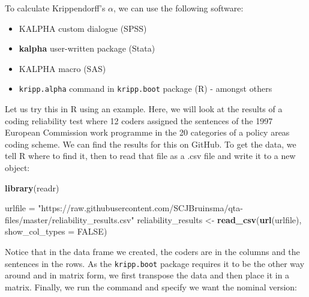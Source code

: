 \documentclass[
]{book}
\newenvironment{Shaded}{\begin{snugshade}}{\end{snugshade}}
\newcommand{\AttributeTok}[1]{\textcolor[rgb]{0.13,0.29,0.53}{#1}}
\newcommand{\ConstantTok}[1]{\textcolor[rgb]{0.56,0.35,0.01}{#1}}
\newcommand{\DecValTok}[1]{\textcolor[rgb]{0.00,0.00,0.81}{#1}}
\newcommand{\FunctionTok}[1]{\textcolor[rgb]{0.13,0.29,0.53}{\textbf{#1}}}
\newcommand{\NormalTok}[1]{#1}
\newcommand{\OtherTok}[1]{\textcolor[rgb]{0.56,0.35,0.01}{#1}}
\newcommand{\SpecialCharTok}[1]{\textcolor[rgb]{0.81,0.36,0.00}{\textbf{#1}}}
\newcommand{\StringTok}[1]{\textcolor[rgb]{0.31,0.60,0.02}{#1}}
\providecommand{\tightlist}{%
  \setlength{\itemsep}{0pt}\setlength{\parskip}{0pt}}
\begin{document}
To calculate Krippendorff's \(\alpha\), we can use the following software:

\begin{itemize}
\tightlist
\item
  KALPHA custom dialogue (SPSS)
\item
  \textbf{kalpha} user-written package (Stata)
\item
  KALPHA macro (SAS)
\item
  \texttt{kripp.alpha} command in \texttt{kripp.boot} package (R) - amongst others
\end{itemize}

Let us try this in R using an example. Here, we will look at the results of a coding reliability test where 12 coders assigned the sentences of the 1997 European Commission work programme in the 20 categories of a policy areas coding scheme. We can find the results for this on GitHub. To get the data, we tell R where to find it, then to read that file as a .csv file and write it to a new object:

\begin{Shaded}
\begin{Highlighting}[]
\FunctionTok{library}\NormalTok{(readr)}

\NormalTok{urlfile }\OtherTok{=} \StringTok{"https://raw.githubusercontent.com/SCJBruinsma/qta{-}files/master/reliability\_results.csv"}
\NormalTok{reliability\_results }\OtherTok{\textless{}{-}} \FunctionTok{read\_csv}\NormalTok{(}\FunctionTok{url}\NormalTok{(urlfile), }\AttributeTok{show\_col\_types =} \ConstantTok{FALSE}\NormalTok{)}
\end{Highlighting}
\end{Shaded}

Notice that in the data frame we created, the coders are in the columns and the sentences in the rows. As the \texttt{kripp.boot} package requires it to be the other way around and in matrix form, we first transpose the data and then place it in a matrix. Finally, we run the command and specify we want the nominal version:

\begin{Shaded}
\end{Shaded}
\end{document}
